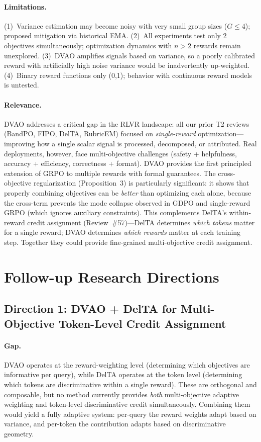 \documentclass[11pt,a4paper]{article}
\begin{document}
\paragraph{Limitations.}
(1)~Variance estimation may become noisy with very small group sizes ($G \leq 4$); proposed mitigation via historical EMA. (2)~All experiments test only 2 objectives simultaneously; optimization dynamics with $n > 2$ rewards remain unexplored. (3)~DVAO amplifies signals based on variance, so a poorly calibrated reward with artificially high noise variance would be inadvertently up-weighted. (4)~Binary reward functions only ({0,1}); behavior with continuous reward models is untested.

\paragraph{Relevance.}
DVAO addresses a critical gap in the RLVR landscape: all our prior T2 reviews (BandPO, FIPO, DelTA, RubricEM) focused on \emph{single-reward} optimization---improving how a single scalar signal is processed, decomposed, or attributed. Real deployments, however, face multi-objective challenges (safety + helpfulness, accuracy + efficiency, correctness + format). DVAO provides the first principled extension of GRPO to multiple rewards with formal guarantees. The cross-objective regularization (Proposition~3) is particularly significant: it shows that properly combining objectives can be \emph{better} than optimizing each alone, because the cross-term prevents the mode collapse observed in GDPO and single-reward GRPO (which ignores auxiliary constraints). This complements DelTA's within-reward credit assignment (Review~\#57)---DelTA determines \emph{which tokens} matter for a single reward; DVAO determines \emph{which rewards} matter at each training step. Together they could provide fine-grained multi-objective credit assignment.

\section*{Follow-up Research Directions}

\subsection*{Direction 1: DVAO + DelTA for Multi-Objective Token-Level Credit Assignment}

\paragraph{Gap.}
DVAO operates at the reward-weighting level (determining which objectives are informative per query), while DelTA operates at the token level (determining which tokens are discriminative within a single reward). These are orthogonal and composable, but no method currently provides \emph{both} multi-objective adaptive weighting and token-level discriminative credit simultaneously. Combining them would yield a fully adaptive system: per-query the reward weights adapt based on variance, and per-token the contribution adapts based on discriminative geometry.
\end{document}
